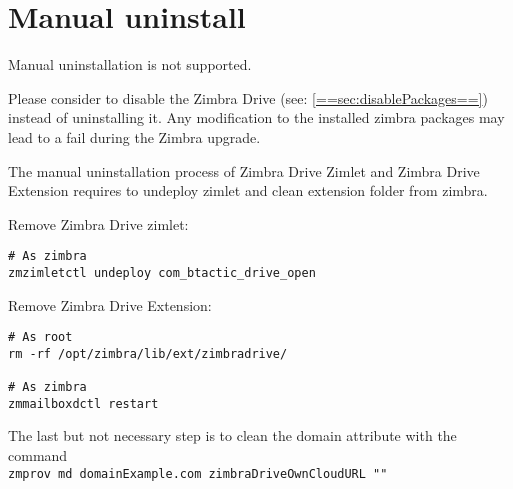 \section{Manual uninstall}

\begin{comment}
WARNING:
\end{comment}
\begin{warning}
    Manual uninstallation is not supported.

    Please consider to disable the Zimbra Drive (see: \ref{==sec:disablePackages==}) instead of uninstalling it.
    Any modification to the installed zimbra packages may lead to a fail during the Zimbra upgrade.
\end{warning}

The manual uninstallation process of Zimbra Drive Zimlet and Zimbra Drive Extension requires to undeploy zimlet and clean extension folder from zimbra.

Remove Zimbra Drive zimlet:
\begin{verbatim}
# As zimbra
zmzimletctl undeploy com_btactic_drive_open
\end{verbatim}
Remove Zimbra Drive Extension:
\begin{verbatim}
# As root
rm -rf /opt/zimbra/lib/ext/zimbradrive/

# As zimbra
zmmailboxdctl restart
\end{verbatim}
The last but not necessary step is to clean the domain attribute with the command\\
\texttt{zmprov md domainExample.com zimbraDriveOwnCloudURL ""}
